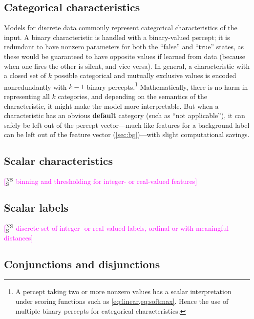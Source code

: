 \documentclass[11pt,letterpaper]{article}
\newcommand{\ensuretext}[1]{#1}
\newcommand{\nssmarker}{\ensuretext{\textcolor{magenta}{\ensuremath{^{\textsc{NS}}_{\textsc{S}}}}}}
\newcommand{\arkcomment}[3]{\ensuretext{\textcolor{#3}{[#1 #2]}}}
\newcommand{\nss}[1]{\arkcomment{\nssmarker}{#1}{magenta}}
\begin{document}
\subsection{Categorical characteristics}

Models for discrete data commonly represent categorical characteristics of the input.
A binary characteristic is handled with a binary-valued percept; it is redundant to have 
nonzero parameters for both the ``false'' and ``true'' states, as these would be guaranteed 
to have opposite values if learned from data (because when one fires the other is silent, and vice versa).
In general, a characteristic with a closed set of $k$ possible categorical and mutually exclusive values 
is encoded nonredundantly with $k-1$ binary percepts.\footnote{A percept taking two or more nonzero values has a scalar 
interpretation under scoring functions such as \cref{eq:linear,eq:softmax}. 
Hence the use of multiple binary percepts for categorical characteristics.}
Mathematically, there is no harm in representing all $k$ categories, 
and depending on the semantics of the characteristic, it might make the model more interpretable.
But when a characteristic has an obvious {\bf default} category (such as ``not applicable''),
it can safely be left out of the percept vector---much like features for a background label 
can be left out of the feature vector (\cref{sec:bg})---with slight computational savings.

\subsection{Scalar characteristics}

\nss{binning and thresholding for integer- or real-valued features}

\subsection{Scalar labels}

\nss{discrete set of integer- or real-valued labels, ordinal or with meaningful distances}

\subsection{Conjunctions and disjunctions}\label{sec:complex}
\end{document}
